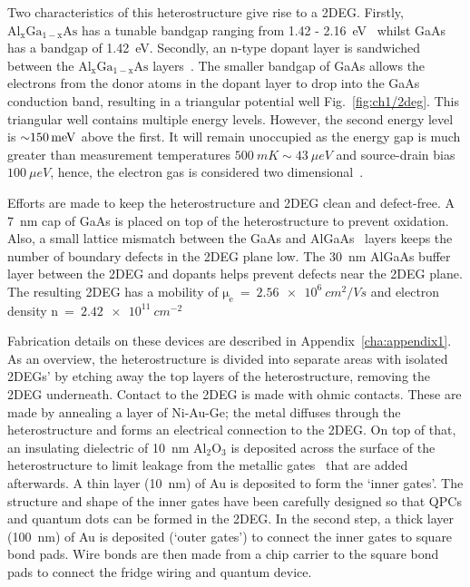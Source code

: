 Two characteristics of this heterostructure give rise to a 2DEG. Firstly, $\mathrm{Al_xGa_{1-x}As}$ has a tunable bandgap ranging from 1.42 - \qty{2.16}{eV}~\cite{gaas_overview} whilst GaAs has a bandgap of \qty{1.42}{eV}. Secondly, an n-type dopant layer is sandwiched between the $\mathrm{Al_xGa_{1-x}As}$ layers~\cite{dopant_layer}. The smaller bandgap of GaAs allows the electrons from the donor atoms in the dopant layer to drop into the GaAs conduction band, resulting in a triangular potential well Fig.~\ref{fig:ch1/2deg}. This triangular well contains multiple energy levels. However, the second energy level is $\qty{\sim 150}{meV}$ above the first. It will remain unoccupied as the energy gap is much greater than measurement temperatures $\qty{500}{mK}\sim\qty{43}{\mu eV}$ and source-drain bias $\qty{100}{\mu eV}$, hence, the electron gas is considered two dimensional~\cite{BEENAKKER_1991}.

Efforts are made to keep the heterostructure and 2DEG clean and defect-free. A \qty{7}{nm} cap of GaAs is placed on top of the heterostructure to prevent oxidation. Also, a small lattice mismatch between the GaAs and AlGaAs~\cite{gaas_superlattice} layers keeps the number of boundary defects in the 2DEG plane low. The \qty{30}{nm} AlGaAs buffer layer between the 2DEG and dopants helps prevent defects near the 2DEG plane. The resulting 2DEG has a mobility of $\mathrm{\mu_e}~=~\qty{2.56e6}{cm^2/Vs}$ and electron density $\mathrm{n}~=~\qty{2.42e11}{cm^{-2}}$

Fabrication details on these devices are described in Appendix~\ref{cha:appendix1}. As an overview, the heterostructure is divided into separate areas with isolated 2DEGs' by etching away the top layers of the heterostructure, removing the 2DEG underneath. Contact to the 2DEG is made with ohmic contacts. These are made by annealing a layer of Ni-Au-Ge; the metal diffuses through the heterostructure and forms an electrical connection to the 2DEG. On top of that, an insulating dielectric of \qty{10}{nm} $\mathrm{Al_2O_3}$ is deposited across the surface of the heterostructure to limit leakage from the metallic gates~\cite{insulating_gates} that are added afterwards. A thin layer (\qty{10}{nm}) of Au is deposited to form the `inner gates'. The structure and shape of the inner gates have been carefully designed so that QPCs and quantum dots can be formed in the 2DEG. In the second step, a thick layer (\qty{100}{nm}) of Au is deposited (`outer gates') to connect the inner gates to square bond pads. Wire bonds are then made from a chip carrier to the square bond pads to connect the fridge wiring and quantum device. 




